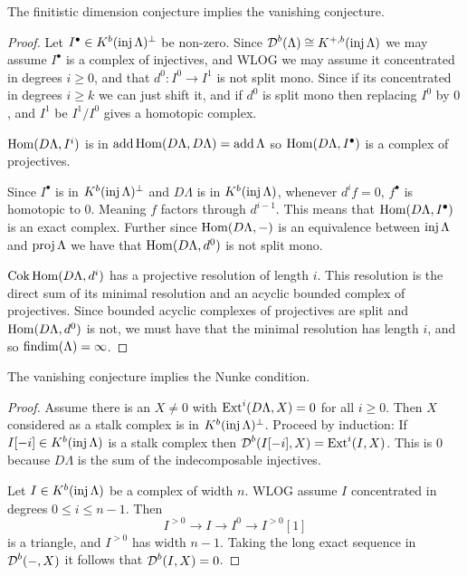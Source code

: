\begin{theorem} \cite[1.2]{Hap93} \label{thm:FDC_implies_VC}
	The finitistic dimension conjecture implies the vanishing conjecture.
	\begin{proof}
		Let $I^\bullet \in K^b(\operatorname{inj}\Lambda)^\perp$ be non-zero. Since $\operatorname{\mathcal{D}}^b(\Lambda) \cong K^{+,b}(\operatorname{inj}\Lambda)$ we may assume $I^\bullet$ is a complex of injectives, and WLOG we may assume it concentrated in degrees $i \geq 0$, and that $d^0\colon I^0 \to I^1$ is not split mono. Since if its concentrated in degrees $i \geq k$ we can just shift it, and if $d^0$ is split mono then replacing $I^0$ by $0$, and $I^1$ be $I^1/I^0$ gives a homotopic complex.
			
		$\operatorname{Hom}(D\Lambda, I^i)$ is in $\operatorname{add}\operatorname{Hom}(D\Lambda, D\Lambda) = \operatorname{add}\Lambda$ so $\operatorname{Hom}(D\Lambda, I^\bullet)$ is a complex of projectives.
		
		\begin{center}
		\end{center}
		
		Since $I^\bullet$ is in $K^b(\operatorname{inj}\Lambda)^\perp$ and $D\Lambda$ is in $K^b(\operatorname{inj}\Lambda)$, whenever $d^if=0$, $f^\bullet$ is homotopic to 0. Meaning $f$ factors through $d^{i-1}$. This means that $\operatorname{Hom}(D\Lambda, I^\bullet)$ is an exact complex. Further since $\operatorname{Hom}(D\Lambda, -)$ is an equivalence between $\operatorname{inj}\Lambda$ and $\operatorname{proj}\Lambda$ we have that $\operatorname{Hom}(D\Lambda, d^0)$ is not split mono.
		
		$\operatorname{Cok}\operatorname{Hom}(D\Lambda, d^i)$ has a projective resolution of length $i$. This resolution is the direct sum of its minimal resolution and an acyclic bounded complex of projectives. Since bounded acyclic complexes of projectives are split and $\operatorname{Hom}(D\Lambda, d^0)$ is not, we must have that the minimal resolution has length $i$, and so $\operatorname{findim}(\Lambda) = \infty$.
	\end{proof}
\end{theorem}

\begin{theorem} \cite[1.2]{Hap93} \label{thm:VC_implies_Nuc}
	The vanishing conjecture implies the Nunke condition.
	\begin{proof}
		Assume there is an $X \neq 0$ with $\operatorname{Ext}^i(D\Lambda, X) = 0$ for all $i \geq 0$. Then $X$ considered as a stalk complex is in $K^b(\operatorname{inj}\Lambda)^\perp$. Proceed by induction: If $I[-i] \in K^b(\operatorname{inj}\Lambda)$ is a stalk complex then $\operatorname{\mathcal{D}}^b(I[-i], X) = \operatorname{Ext}^i(I, X)$. This is 0 because $D\Lambda$ is the sum of the indecomposable injectives.
		
		Let $I \in K^b(\operatorname{inj}\Lambda)$ be a complex of width $n$. WLOG assume $I$ concentrated in degrees $0 \leq i \leq n-1$. Then $$I^{>0} \to I \to I^{0} \to I^{>0}[1]$$ is a triangle, and $I^{>0}$ has width $n-1$. Taking the long exact sequence in $\operatorname{\mathcal{D}}^b(-,X)$ it follows that $\operatorname{\mathcal{D}}^b(I, X)=0$. 
	\end{proof}
\end{theorem}

